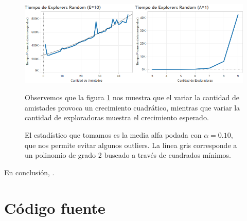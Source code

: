 \documentclass{article}
\theoremstyle{definition}
\theoremstyle{remark}
\begin{document}
\begin{figure}[h!]
\centering
\label{grf:ex3-random}
\includegraphics[width=15cm]{images/ex3-random}
\caption{El estadístico que tomamos es la media alfa podada con $\alpha = 0.10$, que nos permite evitar algunos outliers. La línea gris corresponde a un polinomio de grado 2 buscado a través de cuadrados mínimos.}

Observemos que la figura \ref{grf:ex3-random} nos muestra que el variar la cantidad de amistades provoca un crecimiento cuadrático, mientras que variar la cantidad de exploradoras muestra el crecimiento esperado.

\end{figure}


En conclusión, .

\section{Código fuente}








\end{document}

